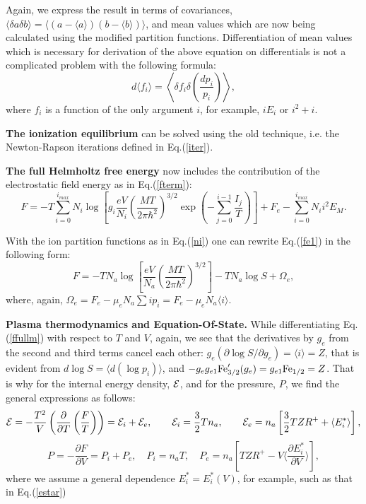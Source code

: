 Again, we express the result in terms of covariances,
$\langle \delta a \delta b \rangle = \langle (a - \langle a \rangle) (b - \langle b \rangle) \rangle$,
and mean values which are now being calculated
using the modified partition functions.
Differentiation of mean values which is necessary for derivation of the above equation on
differentials is not a complicated problem with the following formula:
\begin{equation}
d \langle f_i \rangle = \left\langle \delta f_i \delta\left( \frac{dp_i}{p_i} \right) \right\rangle,
\end{equation}
where $f_i$ is a function of the only argument $i$, for example, $iE_i$ or $i^2+i$.

{\bf The ionization equilibrium} can be solved using the old technique, i.e. the Newton-Rapson
iterations defined in Eq.(\ref{iter}).

{\bf The full Helmholtz free energy} now includes the contribution of the electrostatic field energy as in Eq.(\ref{fterm}):
\begin{equation}\label{fe1}
F=-T
\sum_{i=0}^{i_{max}}{
N_i\log\left[g_i
  \frac{eV}{N_i}\left(\frac{MT}{2\pi \hbar^2}\right)^{3/2}\exp \left(-\sum_{j=0}^{i-1}\frac{I_j}T \right)\right]}+F_e
  - \sum_{i=0}^{i_{max}} {N_ii^2 E_M}.
\end{equation}  

With the ion partition functions as in Eq.(\ref{ni}) one can rewrite Eq.(\ref{fe1}) in the following form:
\begin{equation}\label{ffullm}
F = -TN_a\log\left[\frac{eV}{N_a}\left(\frac{MT}{2\pi \hbar^2}\right)^{3/2}\right]-TN_a\log S + \Omega_e, 
\end{equation}
where, again, $\Omega_e = F_e - \mu_e N_a \sum i p_i = F_e - \mu_e N_a \langle i \rangle $.

{\bf Plasma thermodynamics and Equation-Of-State.} 
While differentiating Eq.(\ref{ffullm}) with respect to $T$ and $V$, again, we see that the derivatives
by $g_e$ from the second and third terms cancel 
each other: $g_e(\partial \log S/\partial g_e)=\langle i\rangle=Z$,
that is evident from $d \log S = \langle d (\log p_i) \rangle$,
and $-g_eg_{e1}{\rm Fe}^\prime_{3/2}(g_e)=g_{e1}{\rm Fe}_{1/2}=Z$.
That is why for the internal energy density,
${\cal E}$, and for the pressure, $P$, we find the general expressions
as follows:
\begin{equation}\label{generalE}
{\cal E} = -\frac{T^2}V\left(\frac{\partial}{\partial T}\left(\frac F T\right)\right)=
{\cal E}_i+{\cal E}_e,\qquad{\cal E}_i=\frac32Tn_a,\qquad
{\cal E}_e = n_a\left[ \frac32 T Z R^+ + \langle E^*_i \rangle \right],
\end{equation}
\begin{equation}\label{generalP}
P = -\frac{\partial F}{\partial V}=P_i+P_e,\quad
P_i = n_aT,\quad
P_e = n_a \left[ T ZR^+ - V \langle \frac{\partial E^*_i}{\partial V} \rangle \right],
\end{equation}
where we assume a general dependence $E^*_i=E^*_i(V)$, for example, such as that in Eq.(\ref{estar})

